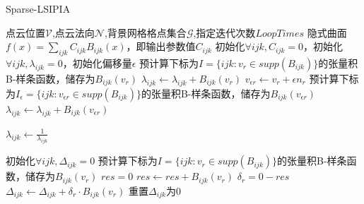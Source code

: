 \begin{algorithm}
    \caption{Sparse-LSIPIA}
    \label{alg:Sparse-LSIPIA}
    \begin{algorithmic}[1]
    \Require 点云位置$\mathcal{V}$,点云法向$\mathcal{N}$,背景网格格点集合$\mathcal{G}$,指定迭代次数$LoopTimes$
    \Ensure 隐式曲面$f(x) = \sum_{ijk} C_{ijk}B_{ijk}(x)$，即输出参数值$C_{ijk}$
    \State 初始化$\forall ijk,C_{ijk} = 0$，初始化$\forall ijk,\lambda_{ijk} = 0$，初始化偏移量$\epsilon$
        \State 预计算下标为$I = \{ijk : v_r \in supp(B_{ijk})\}$的张量积B-样条函数，储存为$B_{ijk}(v_r)$
            \State $\lambda_{ijk} \leftarrow \lambda_{ijk} + B_{ijk}(v_r)$
        \EndFor
        \State $v_{\epsilon r} \leftarrow v_r + \epsilon n_r$
        \State 预计算下标为$I_{\epsilon} = \{ijk : v_{\epsilon r} \in supp(B_{ijk})\}$的张量积B-样条函数，储存为$B_{ijk}(v_{\epsilon r})$
            \State $\lambda_{ijk} \leftarrow \lambda_{ijk} + B_{ijk}(v_{\epsilon r})$
        \EndFor
    \EndFor
    
            \State $\lambda_{ijk}\leftarrow \frac{1}{\lambda_{ijk}}$
        \EndIf
    \EndFor

    \State 初始化$\forall ijk,\Delta_{ijk} = 0$
            \State 预计算下标为$I = \{ijk : v_r \in supp(B_{ijk})\}$的张量积B-样条函数，储存为$B_{ijk}(v_r)$
            \State $res = 0$
                \State $res \leftarrow res + B_{ijk}(v_r)$ 
            \EndFor
            \State $\delta_r = 0 - res$
                \State $\Delta_{ijk}\leftarrow \Delta_{ijk} + \delta_r \cdot B_{ijk}(v_r)$ 
                \State 重置$\Delta_{ijk}$为0
            \EndFor
        \EndFor
    \EndFor

    \end{algorithmic}
\end{algorithm}

